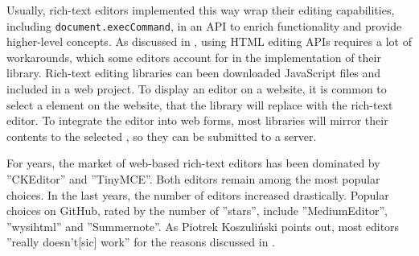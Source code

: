 Usually, rich-text editors implemented this way wrap their editing capabilities, including \texttt{document.execCommand}, in an API to enrich functionality and provide higher-level concepts. As discussed in , using HTML editing APIs requires a lot of workarounds, which some editors account for in the implementation of their library. Rich-text editing libraries can been downloaded JavaScript files and included in a web project. To display an editor on a website, it is common to select a  element on the website, that the library will replace with the rich-text editor. To integrate the editor into web forms, most libraries will mirror their contents to the selected , so they can be submitted to a server.

For years, the market of web-based rich-text editors has been dominated by ''CKEditor'' and ''TinyMCE''. Both editors remain among the most popular choices. In the last years, the number of editors increased drastically. Popular choices on GitHub, rated by the number of ''stars'', include ''MediumEditor'', ''wysihtml'' and ''Summernote''. As Piotrek Koszuli\'{n}ski points out, most editors ''really doesn't[sic] work''\cite{bj} for the reasons discussed in .

